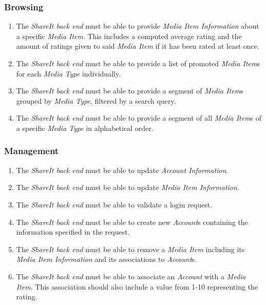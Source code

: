 \documentclass[../report.tex]{subfiles}
\begin{document}
\noindent
\subsubsection{Browsing}

\begin{enumerate}[label=FR-\twodigits*]
\item The \textit{ShareIt back end} must be able to provide \textit{Media Item Information} about a specific \textit{Media Item}. This includes a computed average rating and the amount of ratings given to said \textit{Media Item} if it has been rated at least once.

\item The \textit{ShareIt back end} must be able to provide a list of promoted \textit{Media Item}s for each \textit{Media Type} individually.

\item The \textit{ShareIt back end} must be able to provide a segment of \textit{Media Item}s grouped by \textit{Media Type}, filtered by a search query.

\item The \textit{ShareIt back end} must be able to provide a segment of all \textit{Media Item}s of a specific \textit{Media Type} in alphabetical order.

\end{enumerate}

\noindent
\subsubsection{Management}

\begin{enumerate}[label=FR-\twodigits*,resume]
\item The \textit{ShareIt back end} must be able to update \textit{Account Information}. 

\item The \textit{ShareIt back end} must be able to update \textit{Media Item Information}.

\item The \textit{ShareIt back end} must be able to validate a login request.

\item The \textit{ShareIt back end} must be able to create new \textit{Account}s containing the information specified in the request.

\item The \textit{ShareIt back end} must be able to remove a \textit{Media Item} including its \textit{Media Item Information} and its associations to \textit{Account}s.

\item The \textit{ShareIt back end} must be able to associate an \textit{Account} with a \textit{Media Item}. This association should also include a value from 1-10 representing the rating.

\end{enumerate}
\end{document}
